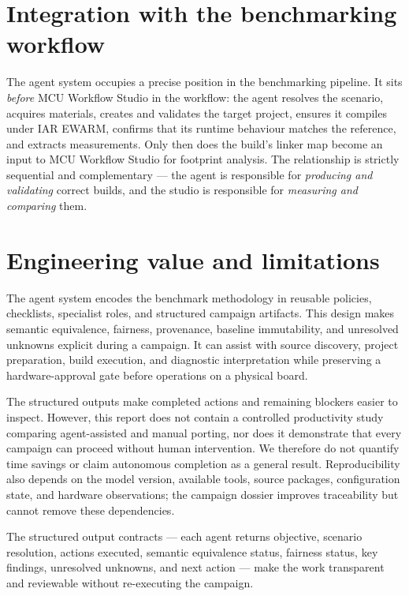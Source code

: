 \section{Integration with the benchmarking workflow}
\label{sec:agent-integration}

The agent system occupies a precise position in the benchmarking pipeline. It sits
\emph{before} MCU Workflow Studio in the workflow: the agent resolves the scenario, acquires
materials, creates and validates the target project, ensures it compiles under IAR EWARM,
confirms that its runtime behaviour matches the reference, and extracts measurements. Only
then does the build's linker map become an input to MCU Workflow Studio for footprint
analysis. The relationship is strictly sequential and complementary --- the agent is
responsible for \emph{producing and validating} correct builds, and the studio is
responsible for \emph{measuring and comparing} them.

\section{Engineering value and limitations}
\label{sec:agent-value}

The agent system encodes the benchmark methodology in reusable policies, checklists,
specialist roles, and structured campaign artifacts. This design makes semantic equivalence,
fairness, provenance, baseline immutability, and unresolved unknowns explicit during a
campaign. It can assist with source discovery, project preparation, build execution, and
diagnostic interpretation while preserving a hardware-approval gate before operations on a
physical board.

The structured outputs make completed actions and remaining blockers easier to inspect.
However, this report does not contain a controlled productivity study comparing agent-assisted
and manual porting, nor does it demonstrate that every campaign can proceed without human
intervention. We therefore do not quantify time savings or claim autonomous completion as a
general result. Reproducibility also depends on the model version, available tools, source
packages, configuration state, and hardware observations; the campaign dossier improves
traceability but cannot remove these dependencies.

The structured output contracts --- each agent returns objective, scenario resolution,
actions executed, semantic equivalence status, fairness status, key findings, unresolved
unknowns, and next action --- make the work transparent and reviewable without re-executing
the campaign.

